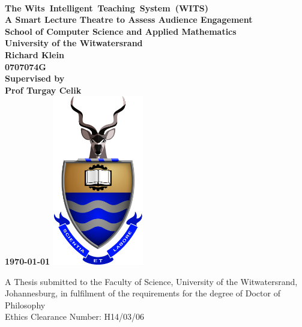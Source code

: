 \documentclass[a4paper,twoside,12pt]{report}
\begin{document}
\onecolumn
\thispagestyle{empty}


\setcounter{page}{0}
\ 
\begin{center}
  
  {
  \Large \bf \sc The Wits~Intelligent~Teaching~System~(WITS)\\
  \large A Smart Lecture Theatre to Assess Audience Engagement\\[20pt]
  \large School of Computer Science and Applied Mathematics\\
  \large University of the Witwatersrand\\[20pt]
  \normalsize
  Richard Klein\\
  0707074G\\[20pt]
  Supervised by\\Prof Turgay Celik\\[10pt]
  \today
  }
  \vfill
  \includegraphics[width=4cm]{images/wits}
  \vfill

  \vfill
  A Thesis submitted to the Faculty of Science, University of the Witwatersrand, Johannesburg, in fulfilment of the requirements for the degree of Doctor of Philosophy\\[10pt]
  \small{Ethics Clearance Number: H14/03/06}\\
\end{center}
\vfill
\newpage

\pagestyle{plain}
\setcounter{page}{1}
\end{document}
